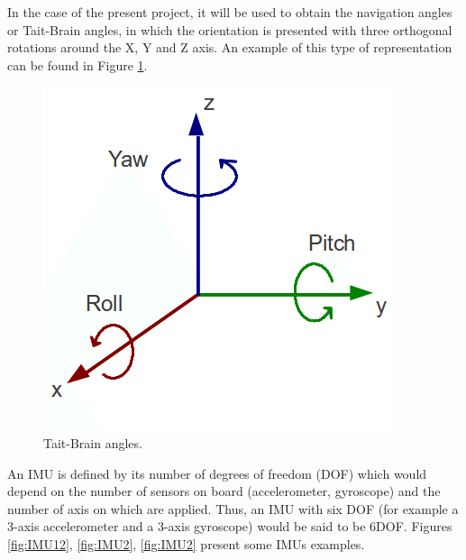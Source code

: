 In the case of the present project, it will be used to obtain the navigation angles or Tait-Brain angles, in which the orientation is presented with three orthogonal rotations around the X, Y and Z axis. An example of this type of representation can be found in Figure \ref{fig:orientacion}.\newline


\begin{figure}[H]
	\center
	\includegraphics[scale=0.5]{imagenes/Balancing_robot/orientacion}
	\caption{Tait-Brain angles.}
	\label{fig:orientacion}
\end{figure}


An IMU is defined by its number of degrees of freedom (DOF) which would depend on the number of sensors on board (accelerometer, gyroscope) and the number of axis on which are applied. Thus, an IMU with six DOF (for example a 3-axis accelerometer and a 3-axis gyroscope) would be said to be 6DOF. \newline
\newpage
Figures \ref{fig:IMU12}, \ref{fig:IMU2}, \ref{fig:IMU2} present some IMUs examples.

